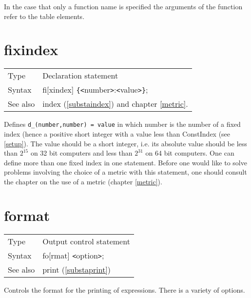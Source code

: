 \noindent In the case that only a function name is specified the arguments 
of the function refer to the table elements.
\vspace{10mm}

 
\section{fixindex}
\label{substafixindex}

\noindent \begin{tabular}{ll}
Type & Declaration statement\\
Syntax & fi[xindex] \verb:{:{\tt<}number{\tt>}:{\tt<}value{\tt>}\verb:}:;
\\ See also & index (\ref{substaindex}) and chapter \ref{metric}.
\end{tabular} \vspace{4mm}

\noindent Defines \verb:d_(number,number) = value: in which number is the 
number of a fixed index 
(hence a positive short integer with a value less than 
ConstIndex (see \ref{setup}). The value should be a 
short integer, i.e. its absolute value should be less 
than $2^{15}$ on 32 bit computers and less than $2^{31}$ on 
64 bit 
computers. One can define more than one fixed index in one statement. 
Before one would like to solve problems involving the choice of a metric 
with this statement, one should consult the chapter on the use of a 
metric 
(chapter \ref{metric}).
\vspace{10mm}


\section{format}
\label{substaformat}

\noindent \begin{tabular}{ll}
Type & Output control statement\\
Syntax & fo[rmat] {\tt<}option{\tt>};
\\ See also & print (\ref{substaprint})
\end{tabular} \vspace{4mm}

\noindent Controls the format for the 
printing of expressions. There is a variety of options.

